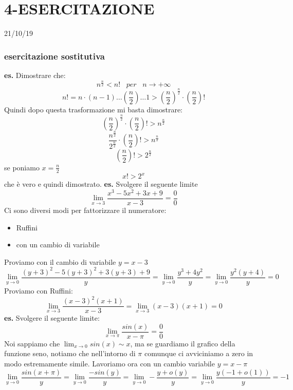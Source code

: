 \section*{4-ESERCITAZIONE}
21/10/19
\subsubsection*{esercitazione sostitutiva}
\textbf{es.} Dimostrare che:
\[
    n^{\frac{n}{2}} < n! \;\;\; per \;\;\; n \rightarrow + \infty
\]
\[
    n! = n \cdot (n-1) \dots (\frac{n}{2}) \dots 1 > (\frac{n}{2})^{\frac{n}{2}} \cdot (\frac{n}{2})!
\]
Quindi dopo questa trasformazione mi basta dimostrare:
\[
    (\frac{n}{2})^{\frac{n}{2}} \cdot (\frac{n}{2})! > n ^ {\frac{n}{2}}
\]
\[
    \frac{n^{\frac{n}{2}}}{2^{\frac{n}{2}}} \cdot  (\frac{n}{2})! > n^{\frac{n}{2}}
\]
\[
    (\frac{n}{2})! > 2 ^{\frac{n}{2}}
\]
se poniamo $x = \frac{n}{2}$
\[
    x! > 2^x
\]
che è vero e quindi dimostrato.
\newline
\newline
\newline
\textbf{es.} Svolgere il seguente limite
\[
    \lim_{x\rightarrow 3} \frac{x^3-5x^2+3x+9}{x-3} = \frac{0}{0}
\]
Ci sono diversi modi per fattorizzare il numeratore:
\begin{itemize}
    \item Ruffini
    \item con un cambio di variabile
\end{itemize}
Proviamo con il cambio di variabile $y= x-3$
\[
    \lim_{y\rightarrow 0} \frac{(y+3)^2-5(y+3)^2+3(y+3)+9}{y}= \lim_{y\rightarrow 0} \frac{y^3+4y^2}{y} = \lim_{y\rightarrow 0}\frac{y^2(y+4)}{y} = 0
\]
Proviamo con Ruffini:
\[
    \lim_{x\rightarrow 3} \frac{(x-3)^2(x+1)}{x-3}= \lim_{x\rightarrow 3}(x-3)(x+1) = 0
\]
\newline
\newline
\textbf{es.} Svolgere il seguente limite:
\[
    \lim_{x\rightarrow \pi} \frac{sin(x)}{x-\pi} = \frac{0}{0}
\]
Noi sappiamo che $\lim_{x\rightarrow 0} sin(x) \sim x$, ma se guardiamo il grafico della funzione seno, notiamo che nell'intorno di $\pi$ comunque ci avviciniamo a zero in modo estremamente simile.
\newline
Lavoriamo ora con un cambio variabile $y=x-\pi$
\[
    \lim_{y\rightarrow 0} \frac{sin(x+\pi)}{y} = \lim_{y\rightarrow 0} \frac{-sin(y)}{y}= \lim_{y\rightarrow 0}-\frac{y+o(y)}{y}= \lim_{y\rightarrow 0}\frac{y(-1+o(1))}{y} = -1
\]
\newline
\newline
